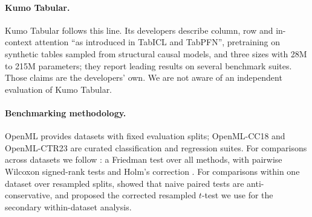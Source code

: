 \paragraph{Kumo Tabular.}
Kumo Tabular \citep{nvidia_kumo_card,nvidia_kumo_blog} follows this line. Its developers describe column, row and
in-context attention ``as introduced in TabICL and TabPFN'', pretraining on synthetic tables sampled from structural
causal models, and three sizes with 28M to 215M parameters; they report leading results on several benchmark suites.
Those claims are the developers' own. We are not aware of an independent evaluation of Kumo Tabular.

\paragraph{Benchmarking methodology.}
OpenML \citep{vanschoren2014openml} provides datasets with fixed evaluation splits; OpenML-CC18
\citep{bischl2021openml} and OpenML-CTR23 \citep{fischer2023ctr23} are curated classification and regression suites.
For comparisons across datasets we follow \citet{demsar2006comparisons}: a Friedman test \citep{friedman1937ranks}
over all methods, with pairwise Wilcoxon signed-rank tests \citep{wilcoxon1945} and Holm's correction
\citep{holm1979}. For comparisons within one dataset over resampled splits, \citet{dietterich1998tests} showed that
naive paired tests are anti-conservative, and \citet{nadeau2003inference} proposed the corrected resampled $t$-test
we use for the secondary within-dataset analysis.
